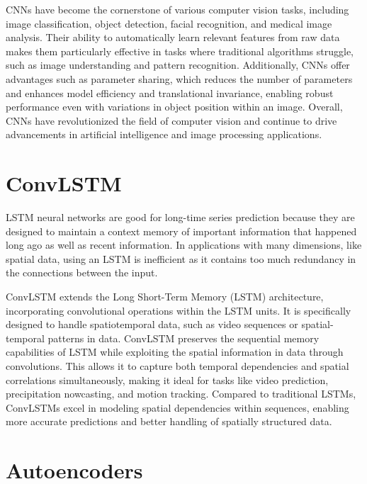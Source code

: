 CNNs have become the cornerstone of various computer vision tasks, including image classification, object detection, facial recognition, and medical image analysis. Their ability to automatically learn relevant features from raw data makes them particularly effective in tasks where traditional algorithms struggle, such as image understanding and pattern recognition. Additionally, CNNs offer advantages such as parameter sharing, which reduces the number of parameters and enhances model efficiency and translational invariance, enabling robust performance even with variations in object position within an image. Overall, CNNs have revolutionized the field of computer vision and continue to drive advancements in artificial intelligence and image processing applications.

\section{ConvLSTM}
\label{sec:ConvLSTM} 

LSTM neural networks are good for long-time series prediction because they are designed to maintain a context memory of important information that happened long ago as well as recent information. In applications with many dimensions, like spatial data, using an LSTM is inefficient as it contains too much redundancy in the connections between the input. 

ConvLSTM extends the Long Short-Term Memory (LSTM) architecture, incorporating convolutional operations within the LSTM units. It is specifically designed to handle spatiotemporal data, such as video sequences or spatial-temporal patterns in data. ConvLSTM preserves the sequential memory capabilities of LSTM while exploiting the spatial information in data through convolutions. This allows it to capture both temporal dependencies and spatial correlations simultaneously, making it ideal for tasks like video prediction, precipitation nowcasting, and motion tracking. Compared to traditional LSTMs, ConvLSTMs excel in modeling spatial dependencies within sequences, enabling more accurate predictions and better handling of spatially structured data.

\section{Autoencoders}
\label{sec:Autoencoders} 

